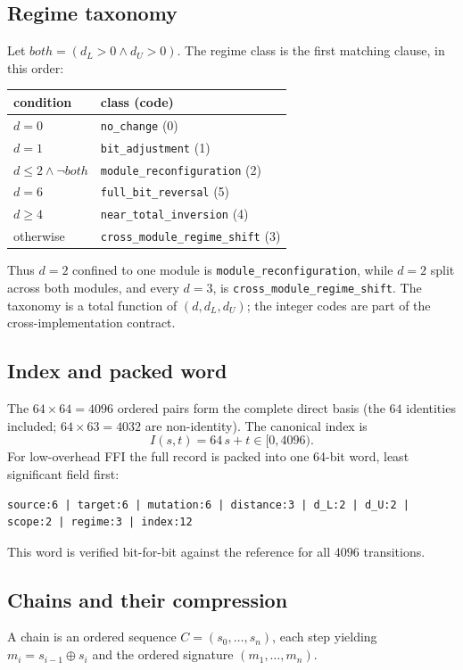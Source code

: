 \documentclass[11pt,a4paper]{article}
\begin{document}
\subsection{Regime taxonomy}
Let $\mathit{both} = (d_L>0 \wedge d_U>0)$. The regime class is the first matching
clause, in this order:
\begin{center}
\begin{tabular}{ll}
\toprule
condition & class (code) \\
\midrule
$d=0$ & \texttt{no\_change} (0) \\
$d=1$ & \texttt{bit\_adjustment} (1) \\
$d\le 2 \wedge \neg\mathit{both}$ & \texttt{module\_reconfiguration} (2) \\
$d=6$ & \texttt{full\_bit\_reversal} (5) \\
$d\ge 4$ & \texttt{near\_total\_inversion} (4) \\
otherwise & \texttt{cross\_module\_regime\_shift} (3) \\
\bottomrule
\end{tabular}
\end{center}
Thus $d=2$ confined to one module is \texttt{module\_reconfiguration}, while $d=2$
split across both modules, and every $d=3$, is
\texttt{cross\_module\_regime\_shift}. The taxonomy is a total function of
$(d,d_L,d_U)$; the integer codes are part of the cross-implementation contract.

\subsection{Index and packed word}
The $64\times64=4096$ ordered pairs form the complete direct basis (the $64$
identities included; $64\times63=4032$ are non-identity). The canonical index is
\begin{equation}
I(s,t) = 64\,s + t \in [0,4096).
\end{equation}
For low-overhead FFI the full record is packed into one 64-bit word, least
significant field first:
\begin{lstlisting}
source:6 | target:6 | mutation:6 | distance:3 | d_L:2 | d_U:2 | scope:2 | regime:3 | index:12
\end{lstlisting}
This word is verified bit-for-bit against the reference for all $4096$ transitions.

\subsection{Chains and their compression}
A chain is an ordered sequence $C=(s_0,\dots,s_n)$, each step yielding
$m_i = s_{i-1}\oplus s_i$ and the ordered signature $(m_1,\dots,m_n)$.
\end{document}
